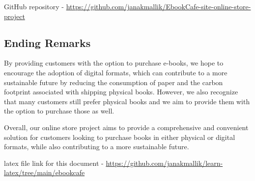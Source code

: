 \documentclass[12pt,a4paper]{article}
\begin{document}
GitHub repository - \href{https://github.com/janakmallik/EbookCafe-site-online-store-project}{https://github.com/janakmallik/EbookCafe-site-online-store-project}
\subsection{Ending Remarks}
By providing customers with the option to purchase e-books, we hope to encourage the adoption of digital formats, which can contribute to a more sustainable future by reducing the consumption of paper and the carbon footprint associated with shipping physical books. However, we also recognize that many customers still prefer physical books and we aim to provide them with the option to purchase those as well.

Overall, our online store project aims to provide a comprehensive and convenient solution for customers looking to purchase books in either physical or digital formats, while also contributing to a more sustainable future.

\vspace{2cm}
latex file link for this document - \href{https://github.com/janakmallik/learn-latex/tree/main/ebookcafe}{https://github.com/janakmallik/learn-latex/tree/main/ebookcafe}
\end{document}

